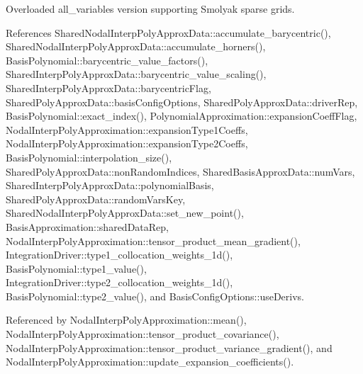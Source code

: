 Overloaded all\+\_\+variables version supporting Smolyak sparse grids. 

References Shared\+Nodal\+Interp\+Poly\+Approx\+Data\+::accumulate\+\_\+barycentric(), Shared\+Nodal\+Interp\+Poly\+Approx\+Data\+::accumulate\+\_\+horners(), Basis\+Polynomial\+::barycentric\+\_\+value\+\_\+factors(), Shared\+Interp\+Poly\+Approx\+Data\+::barycentric\+\_\+value\+\_\+scaling(), Shared\+Interp\+Poly\+Approx\+Data\+::barycentric\+Flag, Shared\+Poly\+Approx\+Data\+::basis\+Config\+Options, Shared\+Poly\+Approx\+Data\+::driver\+Rep, Basis\+Polynomial\+::exact\+\_\+index(), Polynomial\+Approximation\+::expansion\+Coeff\+Flag, Nodal\+Interp\+Poly\+Approximation\+::expansion\+Type1\+Coeffs, Nodal\+Interp\+Poly\+Approximation\+::expansion\+Type2\+Coeffs, Basis\+Polynomial\+::interpolation\+\_\+size(), Shared\+Poly\+Approx\+Data\+::non\+Random\+Indices, Shared\+Basis\+Approx\+Data\+::num\+Vars, Shared\+Interp\+Poly\+Approx\+Data\+::polynomial\+Basis, Shared\+Poly\+Approx\+Data\+::random\+Vars\+Key, Shared\+Nodal\+Interp\+Poly\+Approx\+Data\+::set\+\_\+new\+\_\+point(), Basis\+Approximation\+::shared\+Data\+Rep, Nodal\+Interp\+Poly\+Approximation\+::tensor\+\_\+product\+\_\+mean\+\_\+gradient(), Integration\+Driver\+::type1\+\_\+collocation\+\_\+weights\+\_\+1d(), Basis\+Polynomial\+::type1\+\_\+value(), Integration\+Driver\+::type2\+\_\+collocation\+\_\+weights\+\_\+1d(), Basis\+Polynomial\+::type2\+\_\+value(), and Basis\+Config\+Options\+::use\+Derivs.



Referenced by Nodal\+Interp\+Poly\+Approximation\+::mean(), Nodal\+Interp\+Poly\+Approximation\+::tensor\+\_\+product\+\_\+covariance(), Nodal\+Interp\+Poly\+Approximation\+::tensor\+\_\+product\+\_\+variance\+\_\+gradient(), and Nodal\+Interp\+Poly\+Approximation\+::update\+\_\+expansion\+\_\+coefficients().

